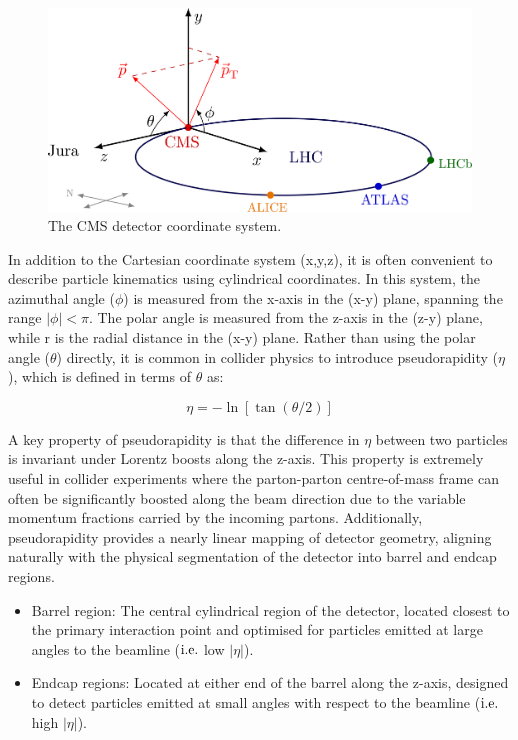 \begin{figure}[h]
\centering
\includegraphics[width= 1\textwidth]{Figures/Chapter3/CMS_CoordinateSystem.png}
\caption{The CMS detector coordinate system.}
\label{Figure:Chapter3_CMS_CoordinateSystem}
\end{figure}

In addition to the Cartesian coordinate system (x,y,z), it is often convenient to describe particle kinematics using cylindrical coordinates. In this system, the azimuthal angle ($\phi$) is measured from the x-axis in the (x-y) plane, spanning the range $|\phi| < \pi$. The polar angle is measured from the z-axis in the (z-y) plane, while r is the radial distance in the (x-y) plane. Rather than using the polar angle ($\theta$) directly, it is common in collider physics to introduce pseudorapidity ($\eta$), which is defined in terms of $\theta$ as:

\begin{equation}
    \eta = - \ln[\tan(\theta/2)]
\end{equation}

A key property of pseudorapidity is that the difference in $\eta$ between two particles is invariant under Lorentz boosts along the z-axis. This property is extremely useful in collider experiments where the parton-parton centre-of-mass frame can often be significantly boosted along the beam direction due to the variable momentum fractions carried by the incoming partons. Additionally, pseudorapidity provides a nearly linear mapping of detector geometry, aligning naturally with the physical segmentation of the detector into barrel and endcap regions.

\begin{itemize} 
\item Barrel region: The central cylindrical region of the detector, located closest to the primary interaction point and optimised for particles emitted at large angles to the beamline ($\mbox{i.e.}$ low $|\eta|$). 
\item Endcap regions: Located at either end of the barrel along the z-axis, designed to detect particles emitted at small angles with respect to the beamline ($\mbox{i.e.}$ high $|\eta|$). 
\end{itemize}

